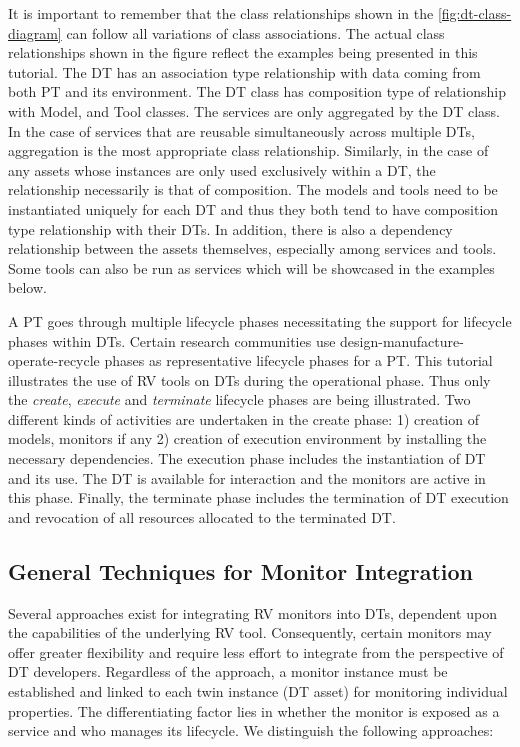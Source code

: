 It is important to remember that the class relationships shown in the \cref{fig:dt-class-diagram} can follow all variations of class associations. The actual class relationships shown in the figure reflect the examples being presented in this tutorial. The DT has an association type relationship with data coming from both PT and its environment. The DT class has composition type of relationship with Model, and Tool classes. The services are only aggregated by the DT class. In the case of services that are reusable simultaneously across multiple DTs, aggregation is the most appropriate class relationship. Similarly, in the case of any assets whose instances are only used exclusively within a DT, the relationship necessarily is that of composition. The models and tools need to be instantiated uniquely for each DT and thus they both tend to have composition type relationship with their DTs.
In addition, there is also a dependency relationship between the assets themselves, especially among services and tools. Some tools can also be run as services which will be showcased in the examples below.

A PT goes through multiple lifecycle phases necessitating the support for lifecycle phases within DTs. Certain research communities use design-manufacture-operate-recycle phases as representative lifecycle phases for a PT. This tutorial illustrates the use of RV tools on DTs during the operational phase. Thus only the \emph{create}, \emph{execute} and \emph{terminate} lifecycle phases are being illustrated. Two different kinds of activities are undertaken in the create phase: 1) creation of models, monitors if any 2) creation of execution environment by installing the necessary dependencies.
The execution phase includes the instantiation of DT and its use. The DT is available for interaction and the monitors are active in this phase. Finally, the terminate phase includes the termination of DT execution and revocation of all resources allocated to the terminated DT.

\subsection{General Techniques for Monitor Integration}
Several approaches exist for integrating RV monitors into DTs, dependent upon the capabilities of the underlying RV tool.%
Consequently, certain monitors may offer greater flexibility and require less effort to integrate from the perspective of DT developers.
Regardless of the approach, a monitor instance must be established and linked to each twin instance (DT asset) for monitoring individual properties.
The differentiating factor lies in whether the monitor is exposed as a service and who manages its lifecycle.
We distinguish the following approaches:


